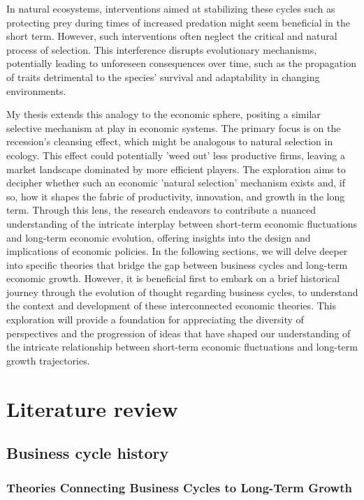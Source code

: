 \documentclass[12pt]{report}
\begin{document}
In natural ecosystems, interventions aimed at stabilizing these cycles  such as protecting prey during times of
increased predation might seem beneficial in the short term. However, such interventions often neglect the critical and
natural process of selection. This interference disrupts evolutionary mechanisms, potentially leading to unforeseen
consequences over time, such as the propagation of traits detrimental to the species' survival and adaptability in
changing environments. 

My thesis extends this analogy to the economic sphere, positing a similar selective mechanism at play in economic
systems. The primary focus is on the recession's cleansing effect, which might be analogous to natural selection in
ecology. This effect could potentially 'weed out' less productive firms, leaving a market landscape dominated by more
efficient players. The exploration aims to decipher whether such an economic 'natural selection' mechanism exists and,
if so, how it shapes the fabric of productivity, innovation, and growth in the long term. Through this lens, the
research endeavors to contribute a nuanced understanding of the intricate interplay between short-term economic
fluctuations and long-term economic evolution, offering insights into the design and implications of economic policies. 
In the following sections, we will delve deeper into specific theories that bridge the gap between business cycles and
long-term economic growth. However, it is beneficial first to embark on a brief historical journey through the evolution
of thought regarding business cycles, to understand the context and development of these interconnected economic
theories. This exploration will provide a foundation for appreciating the diversity of perspectives and the progression
of ideas that have shaped our understanding of the intricate relationship between short-term economic fluctuations and
long-term growth trajectories. 
\chapter{Literature review}
\section{Business cycle history}

\subsection{Theories Connecting Business Cycles to Long-Term Growth}
\end{document}
